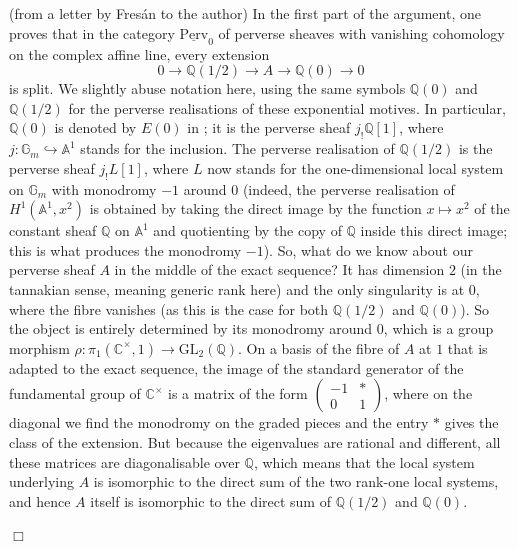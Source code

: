 \documentclass[12pt,leqno]{article}
\newcommand{\A}{{\mathbb{A}}}
\newcommand{\C}{{\mathbb{C}}}
\newcommand{\Ge}{\mathbb{G}}
\newcommand{\Q}{{\mathbb{Q}}}
\newcommand{\GL}{\mathrm{GL}}
\newcommand{\Perv}{\mathrm{Perv}}
\newenvironment{proof}{\noindent {\bf Proof}}{\mbox{}\hspace*{\fill}$\Box$}
\begin{document}
\begin{proof} (from a letter by Fres\'an to the author)
In the first part of the argument, one proves that in the category $\underline{\Perv}_0$ of perverse sheaves with
vanishing cohomology on the complex affine line, every extension
\[
0 \longrightarrow \Q (1/2) \longrightarrow A \longrightarrow \Q(0) \longrightarrow 0
\]
is split. We slightly abuse notation here, using the same symbols $\Q (0)$ and $\Q(1/2)$ for the perverse realisations of these exponential motives. In particular, $\Q (0)$ is denoted by $E(0)$ in \cite{FJ}; it is the perverse sheaf $j_! \Q [1]$, where $j : \Ge_m \hookrightarrow \A^1$ stands for the inclusion. The perverse realisation of $\Q (1/2)$ is the perverse sheaf $j_! L [1]$, where $L$ now stands for the one-dimensional local system on $\Ge_m$ with monodromy $-1$ around $0$ (indeed, the perverse realisation of $H^1 (\A^1 , x^2)$ is obtained by taking the direct image by the function $x \mapsto x^2$ of the constant sheaf $\Q$ on $\A^1$ and quotienting by the copy of $\Q$ inside this direct image; this is what produces the monodromy $-1$). So, what do we know about our perverse sheaf $A$ in the middle of the exact sequence? It has dimension $2$ (in the tannakian sense, meaning generic rank here) and the only singularity is at $0$, where the fibre vanishes (as this is the case for both $\Q (1/2)$ and $\Q (0)$). So the object is entirely determined by its monodromy around $0$, which is a group morphism $\rho : \pi_1 (\C^{\times} , 1) \to \GL_2 (\Q)$. On a basis of the fibre of $A$ at $1$ that is adapted to the exact sequence, the image of the standard generator of the fundamental group of $\C^{\times}$ is a matrix of the form $\left( \begin{smallmatrix} -1 & * \\ 0 & 1 \end{smallmatrix} \right)$, where on the diagonal we find the monodromy on the graded pieces and the entry $*$ gives the class of the extension. But because the eigenvalues are rational and different, all these matrices are diagonalisable over $\Q$, which means that the local system
underlying $A$ is isomorphic to the direct sum of the two rank-one local systems, and hence $A$ itself is isomorphic to the direct sum of $\Q (1/2)$ and $\Q(0)$.


\end{proof}
\end{document}
